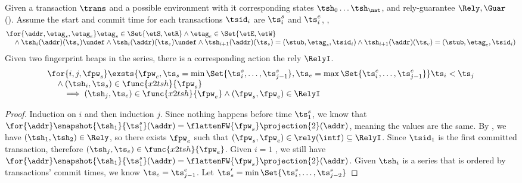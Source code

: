 \begin{lem}
Given a transaction \( \trans \) and a possible environment with it corresponding states \( \tsh_{0} \dots \tsh_{\nat} \), and rely-guarantee \( \Rely, \Guar \) ().
Assume the start and commit time for each transactions \( \tsid_{i} \) are \( \ts_{i}^{s} \) and \( \ts_{i}^{e}\), \ie,
\[
\begin{array}{@{}l@{}}
    \for{ \addr, \etag_{s}, \etag_{e} }
    \etag_{s} \in \Set{\etS, \etR}
    \land \etag_{e} \in \Set{\etE, \etW} \\
    \quad {} \land \tsh_{i}(\addr)(\ts_{s}) \undef
    \land \tsh_{i}(\addr)(\ts_{e}) \undef
    \land \tsh_{i + 1}(\addr)(\ts_{s}) = (\stub,\etag_{s}, \tsid_{i}) 
    \land \tsh_{i + 1}(\addr)(\ts_{e}) = (\stub,\etag_{e}, \tsid_{i}) 
\end{array}
\]
Given two fingerprint heaps in the series, there is a corresponding action the rely \( \RelyI \).
\[
    \begin{array}{@{}l@{}}
    \for{i,j, \fpw_{s}}
    \exsts{\fpw_{e}, \ts_{s} = \min\Set{\ts_{i}^{s}, \dots, \ts_{j - 1}^{s}}, \ts_{e} = \max\Set{\ts_{i}^{e}, \dots, \ts_{j-1}^{e}}} 
    \ts_{i} < \ts_{j} \\
    \quad {} \land (\tsh_{i}, \ts_{s}) \in \func{x2tsh}{\fpw_{s}} \\
    \qquad \implies (\tsh_{j}, \ts_{e}) \in \func{x2tsh}{\fpw_{e}}
    \land (\fpw_{s}, \fpw_{e}) \in \RelyI 
    \end{array}
\]
\end{lem}
\begin{proof}
Induction on \( i \) and then induction \( j \).
Since nothing happens before  time \( \ts_{1}^{s} \), we know that \( \for{\addr} \snapshot{\tsh_{1}}{ \ts_{1}^{s}}(\addr) =  \flattenFW{\fpw_{s}}\projection{2}(\addr) \), meaning the values are the same.
By , we have \( ( \tsh_{1}, \tsh_{2}) \in \Rely \), so there exists \( \fpw_{e} \) such that \( (\fpw_{s}, \fpw_{e}) \in \rely(\intf) \subseteq \RelyI\).
Since \( \tsid_{1} \) is the first committed transaction, therefore \( (\tsh_{j}, \ts_{e}) \in \func{x2tsh}{\fpw_{e}}\).
Given \( i = 1 \) , we still have \( \for{\addr} \snapshot{\tsh_{1}}{ \ts_{1}^{s}}(\addr) =  \flattenFW{\fpw_{s}}\projection{2}(\addr) \).
Given \( \tsh_{i} \) is a series that is ordered by transactions' commit times, we know \( \ts_{e} = \ts_{j-1}^{e} \).
Let \(  \ts_{s}' = \min\Set{\ts_{i}^{s}, \dots, \ts_{j - 2}^{s}} \)

\end{proof}


